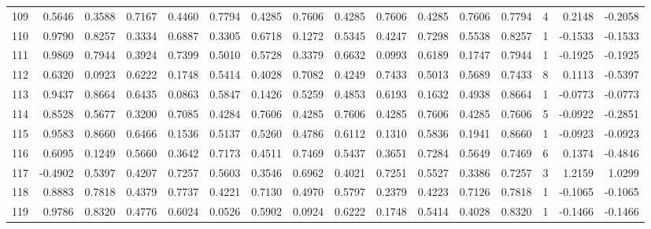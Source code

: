 \begin{tabular}{lrrrrrrrrrrrrrrr}
109 &      0.5646 &  0.3588 &  0.7167 &  0.4460 &  0.7794 &  0.4285 &  0.7606 &  0.4285 &  0.7606 &  0.4285 &   0.7606 &     0.7794 &      4 &                    0.2148 &                    -0.2058 \\
110 &      0.9790 &  0.8257 &  0.3334 &  0.6887 &  0.3305 &  0.6718 &  0.1272 &  0.5345 &  0.4247 &  0.7298 &   0.5538 &     0.8257 &      1 &                   -0.1533 &                    -0.1533 \\
111 &      0.9869 &  0.7944 &  0.3924 &  0.7399 &  0.5010 &  0.5728 &  0.3379 &  0.6632 &  0.0993 &  0.6189 &   0.1747 &     0.7944 &      1 &                   -0.1925 &                    -0.1925 \\
112 &      0.6320 &  0.0923 &  0.6222 &  0.1748 &  0.5414 &  0.4028 &  0.7082 &  0.4249 &  0.7433 &  0.5013 &   0.5689 &     0.7433 &      8 &                    0.1113 &                    -0.5397 \\
113 &      0.9437 &  0.8664 &  0.6435 &  0.0863 &  0.5847 &  0.1426 &  0.5259 &  0.4853 &  0.6193 &  0.1632 &   0.4938 &     0.8664 &      1 &                   -0.0773 &                    -0.0773 \\
114 &      0.8528 &  0.5677 &  0.3200 &  0.7085 &  0.4284 &  0.7606 &  0.4285 &  0.7606 &  0.4285 &  0.7606 &   0.4285 &     0.7606 &      5 &                   -0.0922 &                    -0.2851 \\
115 &      0.9583 &  0.8660 &  0.6466 &  0.1536 &  0.5137 &  0.5260 &  0.4786 &  0.6112 &  0.1310 &  0.5836 &   0.1941 &     0.8660 &      1 &                   -0.0923 &                    -0.0923 \\
116 &      0.6095 &  0.1249 &  0.5660 &  0.3642 &  0.7173 &  0.4511 &  0.7469 &  0.5437 &  0.3651 &  0.7284 &   0.5649 &     0.7469 &      6 &                    0.1374 &                    -0.4846 \\
117 &     -0.4902 &  0.5397 &  0.4207 &  0.7257 &  0.5603 &  0.3546 &  0.6962 &  0.4021 &  0.7251 &  0.5527 &   0.3386 &     0.7257 &      3 &                    1.2159 &                     1.0299 \\
118 &      0.8883 &  0.7818 &  0.4379 &  0.7737 &  0.4221 &  0.7130 &  0.4970 &  0.5797 &  0.2379 &  0.4223 &   0.7126 &     0.7818 &      1 &                   -0.1065 &                    -0.1065 \\
119 &      0.9786 &  0.8320 &  0.4776 &  0.6024 &  0.0526 &  0.5902 &  0.0924 &  0.6222 &  0.1748 &  0.5414 &   0.4028 &     0.8320 &      1 &                   -0.1466 &                    -0.1466 \\

\end{tabular}
